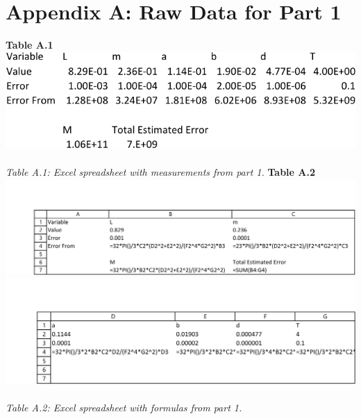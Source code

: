 \documentclass[leqno]{article}
\begin{document}
\section*{Appendix A: Raw Data for Part 1}
\noindent
\textbf{Table A.1}\\
\includegraphics[width=\linewidth]{lab1dataa-crop}\\\\
\textit{\small Table A.1: Excel spreadsheet with measurements from part 1.}
\newpage
\textbf{Table A.2}\\
\includegraphics[width=\linewidth]{lab1dataaf1-crop}
\includegraphics[width=\linewidth]{lab1dataaf2-crop}\\\\
\textit{\small Table A.2: Excel spreadsheet with formulas from part 1.}
\newpage
\end{document}
